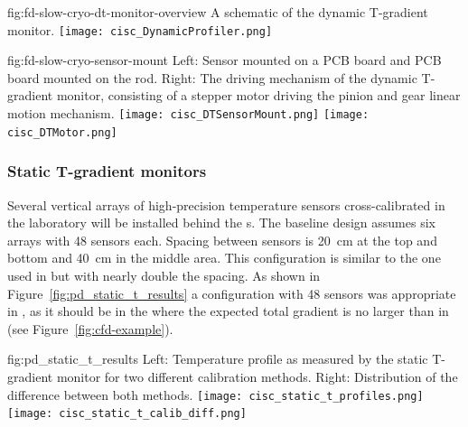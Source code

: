 \begin{dunefigure}{fig:fd-slow-cryo-dt-monitor-overview}
  {%
  A schematic of the dynamic T-gradient monitor.}
 \texttt{[image: cisc\_DynamicProfiler.png]}
\end{dunefigure}
\begin{dunefigure}{fig:fd-slow-cryo-sensor-mount}
  {Left: Sensor mounted on a PCB board and PCB board mounted on the rod. Right:
    The driving mechanism of the dynamic T-gradient monitor, consisting of a stepper motor driving the pinion and gear linear motion mechanism. }
  \texttt{[image: cisc\_DTSensorMount.png]}
  \hspace{3cm}%
  \texttt{[image: cisc\_DTMotor.png]}
\end{dunefigure}


\subsubsection{Static T-gradient monitors}
\label{sec:fdgen-slow-cryo-static-therm}

Several vertical arrays of high-precision temperature sensors cross-calibrated in the laboratory will be installed behind the s.  
The baseline design assumes six arrays with \num{48} sensors each. Spacing between sensors
is \SI{20}{cm} at the top and bottom and \SI{40}{cm} in the middle area. This configuration is similar to the one used in  but with nearly double the spacing. 
As shown in Figure~\ref{fig:pd_static_t_results} a configuration with \num{48} sensors was appropriate in , as it should be in the  where the expected total gradient is no larger than in  (see Figure~\ref{fig:cfd-example}). 

\begin{dunefigure}{fig:pd_static_t_results}{
 Left: Temperature profile as measured by the static T-gradient monitor for two different calibration methods. Right: Distribution of the difference between both methods.}
  \texttt{[image: cisc\_static\_t\_profiles.png]}%
  \texttt{[image: cisc\_static\_t\_calib\_diff.png]}%
\end{dunefigure}

